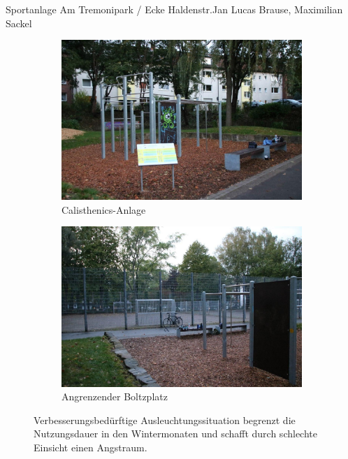 \documentclass{../../templates/amendment}
\begin{document}
\begin{boxed}{Sportanlage Am Tremonipark / Ecke Haldenstr.}{Jan Lucas Brause, Maximilian Sackel}
    \begin{figure}[htpb]
        \centering
        \begin{subfigure}[]{0.49\textwidth}
            \begin{center}
                \includegraphics[width=\linewidth]{pictures/photo1.jpg}
                \caption{Calisthenics-Anlage}%
            \end{center}
        \end{subfigure}
        \begin{subfigure}[]{0.49\textwidth}
            \begin{center}
                \includegraphics[width=\linewidth]{pictures/photo3.jpg}
                \caption{Angrenzender Boltzplatz}%
            \end{center}
        \end{subfigure}
        \caption{Verbesserungsbedürftige Ausleuchtungssituation begrenzt die
            Nutzungsdauer in den Wintermonaten und schafft durch schlechte Einsicht
        einen Angstraum.}
    \end{figure}


\end{boxed}
\end{document}
